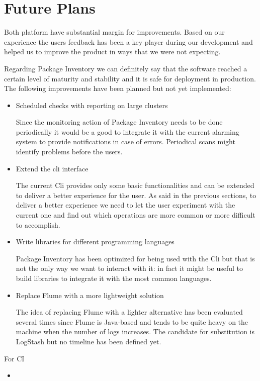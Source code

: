 \section{Future Plans}

Both platform have substantial margin for improvements. Based on our
experience the users feedback has been a key player during our development
and helped us to improve the product in ways that we were not expecting.

Regarding Package Inventory we can definitely say that the software
reached a certain level of maturity and stability and it is safe for
deployment in production. The following improvements have been planned but
not yet implemented:

\begin{itemize}

  \item Scheduled checks with reporting on large clusters

  Since the monitoring action of Package Inventory needs to be done
  periodically it would be a good to integrate it with the current
  alarming system to provide notifications in case of errors. Periodical
  scans might identify problems before the users.

  \item Extend the cli interface

  The current Cli provides only some basic functionalities and can be
  extended to deliver a better experience for the user. As said in the
  previous sections, to deliver a better experience we need to let the
  user experiment with the current one and find out which operations are
  more common or more difficult to accomplish.

  \item Write libraries for different programming languages

  Package Inventory has been optimized for being used with the Cli but
  that is not the only way we want to interact with it: in fact it might
  be useful to build libraries to integrate it with the most common
  languages.

  \item Replace Flume with a more lightweight solution

  The idea of replacing Flume with a lighter alternative has been
  evaluated several times since Flume is Java-based and tends to be quite
  heavy on the machine when the number of logs increases. The candidate
  for substitution is LogStash but no timeline has been defined yet.

\end{itemize}

For CI

\begin{itemize}

  \item 

\end{itemize}
